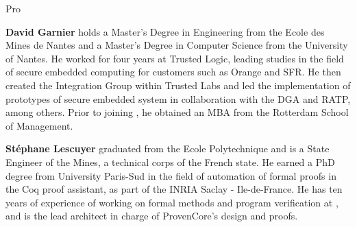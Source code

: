 \begin{sitedescription}{Pro}
\begin{compactitem}
\item {\bf David Garnier} holds a Master's Degree in Engineering from
  the Ecole des Mines de Nantes and a Master's Degree in Computer
  Science from the University of Nantes. He worked for four years at
  Trusted Logic, leading studies in the field of secure embedded
  computing for customers such as Orange and SFR. He then created the
  Integration Group within Trusted Labs and led the implementation of
  prototypes of secure embedded system in collaboration with the DGA
  and RATP, among others. Prior to joining \provenrun{}, he obtained an
  MBA from the Rotterdam School of Management.

\item {\bf Stéphane Lescuyer} graduated from the Ecole
  Polytechnique and is a State Engineer of the Mines, a technical
  corps of the French state. He earned a PhD degree from University
  Paris-Sud in the field of automation of formal proofs in the Coq
  proof assistant, as part of the INRIA Saclay - Ile-de-France. He
  has ten years of experience of working on formal methods and
  program verification at \provenrun, and is the lead architect
  in charge of ProvenCore's design and proofs.
\end{compactitem}

\end{sitedescription}

